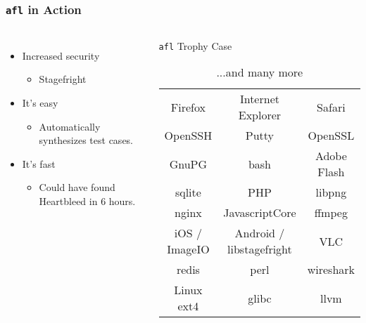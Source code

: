 \begin{frame}
\frametitle{\texttt{afl} in Action}

\begin{columns}


\begin{itemize}
\item{Increased security}
\begin{itemize}
\item{Stagefright}
\end{itemize}
\item{It's easy}
\begin{itemize}
\item{Automatically synthesizes test cases.}
\end{itemize}
\item{It's fast}
\begin{itemize}
\item{Could have found Heartbleed in 6 hours.}
\end{itemize}

\end{itemize}


\begin{center}
\begin{table}
\caption{\texttt{afl} Trophy Case}
\tiny
\begin{tabular}{c | c | c}
Firefox & Internet Explorer & Safari \\
OpenSSH & Putty & OpenSSL \\
GnuPG & bash & Adobe Flash \\
sqlite & PHP & libpng \\
nginx & JavascriptCore & ffmpeg \\
iOS / ImageIO & Android / libstagefright & VLC \\
redis & perl & wireshark \\
Linux ext4 & glibc & llvm \\
\end{tabular}
\caption*{...and many more}
\end{table}
\end{center}

\end{columns}
\end{frame}
